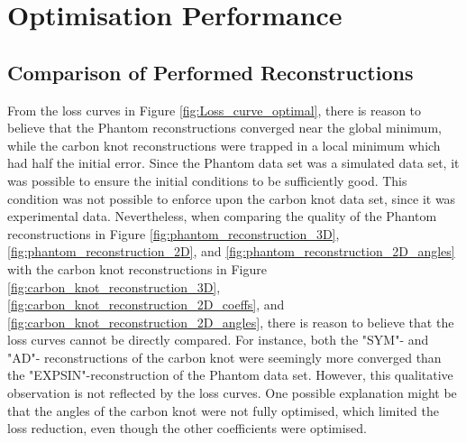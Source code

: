 \chapter{Optimisation Performance}\label{ch:optimisation_performance}


\section{Comparison of Performed Reconstructions}
\noindent
From the loss curves in Figure \ref{fig:Loss_curve_optimal},
there is reason to believe that the Phantom reconstructions converged near the global minimum, while the carbon knot reconstructions
were trapped in a local minimum which had half the initial error.
Since the Phantom data set was a simulated data set, it was possible to ensure the initial conditions to be sufficiently good.
This condition was not possible to enforce upon the carbon knot data set, since it was experimental data.
Nevertheless, when comparing the quality of the Phantom reconstructions in Figure \ref{fig:phantom_reconstruction_3D}, \ref{fig:phantom_reconstruction_2D},
and \ref{fig:phantom_reconstruction_2D_angles} with the carbon knot reconstructions in Figure \ref{fig:carbon_knot_reconstruction_3D}, \ref{fig:carbon_knot_reconstruction_2D_coeffs},
and \ref{fig:carbon_knot_reconstruction_2D_angles}, there is reason to believe that the loss curves cannot be directly compared.
For instance, both the "SYM"- and "AD"- reconstructions of the carbon knot were seemingly more converged than the "EXPSIN"-reconstruction of the Phantom data set.
However, this qualitative observation is not reflected by the loss curves.
One possible explanation might be that the angles of the carbon knot were not fully optimised, which limited the loss reduction, even though the other coefficients were optimised.

